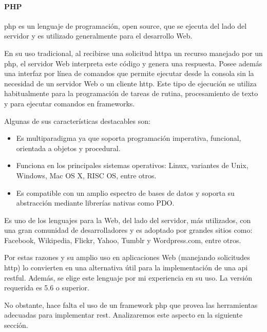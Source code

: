 \paragraph{PHP}

\gls{php} es un lenguaje de programación, \gls{open source}, que se ejecuta del lado del servidor y es utilizado generalmente para el desarrollo Web. 

En su uso tradicional, al recibirse una solicitud \gls{http}a un recurso manejado por un  \gls{php}, el servidor Web interpreta este código y genera una respuesta. Posee además una interfaz por línea de comandos que permite ejecutar  desde la consola sin la necesidad de un servidor Web o un cliente \gls{http}. Este tipo de ejecución se utiliza habitualmente para la programación de tareas de rutina, procesamiento de texto y para ejecutar comandos en \glspl{framework}\cite{achour2017php}.

Algunas de sus características destacables son: 
\begin{itemize}
\item Es multiparadigma ya que soporta programación imperativa, funcional, orientada a objetos y procedural. 
\item Funciona en los principales sistemas operativos: Linux, variantes de Unix, Windows, Mac OS X, RISC OS, entre otros.
\item Es compatible con un amplio espectro de bases de datos y soporta su abstracción mediante librerías nativas como PDO.
\end{itemize}

Es uno de los lenguajes para la Web, del lado del servidor, más utilizados\cite{w3techs2017languages}, con una gran comunidad de desarrolladores y es adoptado por grandes sitios como: Facebook, Wikipedia, Flickr, Yahoo, Tumblr y Wordpress.com, entre otros.


Por estas razones y su amplio uso en aplicaciones Web (manejando solicitudes \gls{http}) lo convierten en una alternativa útil para la implementación de una \gls{api} \gls{restful}. Además, se elige este lenguaje por mi experiencia en su uso. La versión requerida es 5.6 o superior.

No obstante, hace falta el uso de un \gls{framework} \gls{php} que provea las herramientas adecuadas para implementar \gls{rest}. Analizaremos este aspecto en la siguiente sección.

